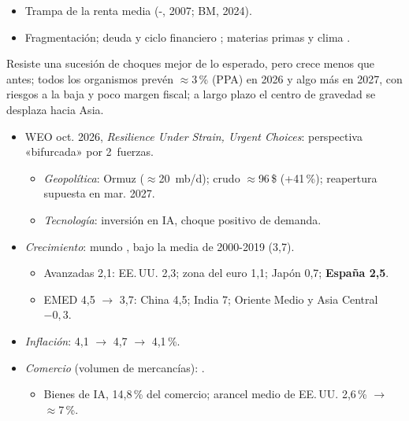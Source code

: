 \documentclass{article}
\begin{document}
\begin{columnas}
\begin{itemize}
\item Trampa de la renta media (-, 2007; BM, 2024).
\item Fragmentación; deuda y ciclo financiero ; materias primas y clima .
\end{itemize}

\begin{ideaclave}
Resiste una sucesión de choques mejor de lo esperado, pero crece menos que antes; todos los organismos prevén $\approx$3\,\% (PPA) en 2026 y algo más en 2027, con riesgos a la baja y poco margen fiscal; a largo plazo el centro de gravedad se desplaza hacia Asia.
\end{ideaclave}

\begin{itemize}
\item WEO oct. 2026, \emph{Resilience Under Strain, Urgent Choices}: perspectiva «bifurcada» por 2~fuerzas.
  \begin{itemize}
  \item \emph{Geopolítica}: Ormuz ($\approx$20~mb/d); crudo $\approx$96\,\$ (+41\,\%); reapertura supuesta en mar. 2027.
  \item \emph{Tecnología}: inversión en IA, choque positivo de demanda.
  \end{itemize}
\item \emph{Crecimiento}: mundo , bajo la media de 2000-2019 (3,7).
  \begin{itemize}
  \item Avanzadas 2,1: EE.\,UU. 2,3; zona del euro 1,1; Japón 0,7; \textbf{España 2,5}.
  \item EMED 4,5 $\to$ 3,7: China 4,5; India 7; Oriente Medio y Asia Central $-0{,}3$.
  \end{itemize}
\end{itemize}
\begin{itemize}
\item \emph{Inflación}: 4,1 $\to$ 4,7 $\to$ 4,1\,\%.
\item \emph{Comercio} (volumen de mercancías): .
  \begin{itemize}
  \item Bienes de IA, 14,8\,\% del comercio; arancel medio de EE.\,UU. 2,6\,\% $\to$ $\approx$7\,\%.
  \end{itemize}
\end{itemize}


\end{columnas}
\end{document}

